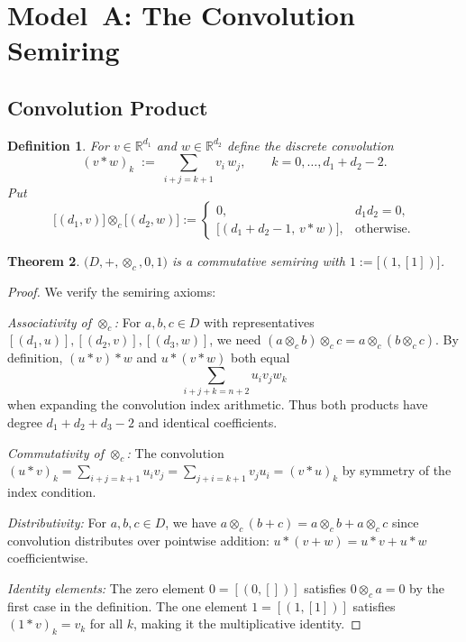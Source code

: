 \documentclass[11pt]{article}
\newtheorem{theorem}{Theorem}[section]
\newtheorem{definition}[theorem]{Definition}
\begin{document}
\section{Model A: The Convolution Semiring}
\label{sec:modelA}
\subsection{Convolution Product}
\begin{definition}
For \(v\in\mathbb R^{d_1}\) and \(w\in\mathbb R^{d_2}\) define the discrete convolution
\[
  (v\ast w)_k \;:=\;\sum_{i+j=k+1} v_i\,w_j,\qquad k=0,\dots,d_1+d_2-2.
\]
Put
\[
  \bigl[(d_1,v)\bigr]\otimes_c\bigl[(d_2,w)\bigr]
  :=\begin{cases}
       0, & d_1d_2=0,\\[2pt]
       \bigl[(d_1+d_2-1,\,v\ast w)\bigr], & \text{otherwise.}
     \end{cases}
\]
\end{definition}

\begin{theorem}\label{thm:convSemiring}
\(\bigl(D,+,\otimes_c,0,1\bigr)\) is a commutative semiring with \(1:=\bigl[(1,[1])\bigr]\).
\end{theorem}
\begin{proof}
We verify the semiring axioms:

\textit{Associativity of $\otimes_c$:} For $a, b, c \in D$ with representatives $[(d_1,u)], [(d_2,v)], [(d_3,w)]$, we need $(a \otimes_c b) \otimes_c c = a \otimes_c (b \otimes_c c)$. By definition, $(u \ast v) \ast w$ and $u \ast (v \ast w)$ both equal
\[
\sum_{i+j+k=n+2} u_i v_j w_k
\]
when expanding the convolution index arithmetic. Thus both products have degree $d_1 + d_2 + d_3 - 2$ and identical coefficients.

\textit{Commutativity of $\otimes_c$:} The convolution $(u \ast v)_k = \sum_{i+j=k+1} u_i v_j = \sum_{j+i=k+1} v_j u_i = (v \ast u)_k$ by symmetry of the index condition.

\textit{Distributivity:} For $a, b, c \in D$, we have $a \otimes_c (b + c) = a \otimes_c b + a \otimes_c c$ since convolution distributes over pointwise addition: $u \ast (v + w) = u \ast v + u \ast w$ coefficientwise.

\textit{Identity elements:} The zero element $0 = [(0,[])]$ satisfies $0 \otimes_c a = 0$ by the first case in the definition. The one element $1 = [(1,[1])]$ satisfies $(1 \ast v)_k = v_k$ for all $k$, making it the multiplicative identity.
\qedhere
\end{proof}
\end{document}

